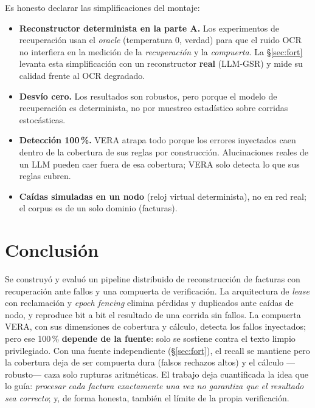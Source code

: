Es honesto declarar las simplificaciones del montaje:
\begin{itemize}[leftmargin=1.4em,itemsep=1pt]
  \item \textbf{Reconstructor determinista en la parte A.} Los experimentos de recuperación
    usan el \emph{oracle} (temperatura 0, verdad) para que el ruido OCR no interfiera en la
    medición de la \emph{recuperación} y la \emph{compuerta}. La §\ref{sec:fort} levanta esta
    simplificación con un reconstructor \textbf{real} (LLM-GSR) y mide su calidad frente al OCR
    degradado.
  \item \textbf{Desvío cero.} Los resultados son robustos, pero porque el modelo de
    recuperación es determinista, no por muestreo estadístico sobre corridas estocásticas.
  \item \textbf{Detección 100\,\%.} VERA atrapa todo porque los errores inyectados caen dentro
    de la cobertura de sus reglas por construcción. Alucinaciones reales de un LLM pueden caer
    fuera de esa cobertura; VERA solo detecta lo que sus reglas cubren.
  \item \textbf{Caídas simuladas en un nodo} (reloj virtual determinista), no en red real; el
    corpus es de un solo dominio (facturas).
\end{itemize}

\section{Conclusión}

Se construyó y evaluó un pipeline distribuido de reconstrucción de facturas con recuperación
ante fallos y una compuerta de verificación. La arquitectura de \emph{lease} con reclamación
y \emph{epoch fencing} elimina pérdidas y duplicados ante caídas de nodo, y reproduce bit a
bit el resultado de una corrida sin fallos. La compuerta VERA, con sus dimensiones de
cobertura y cálculo, detecta los fallos inyectados; pero ese 100\,\% \textbf{depende de la
fuente}: solo se sostiene contra el texto limpio privilegiado. Con una fuente independiente
(§\ref{sec:fort}), el recall se mantiene pero la cobertura deja de ser compuerta dura (falsos
rechazos altos) y el cálculo ---robusto--- caza solo rupturas aritméticas. El trabajo deja
cuantificada la idea que lo guía: \emph{procesar cada factura exactamente una vez no garantiza
que el resultado sea correcto}; y, de forma honesta, también el límite de la propia
verificación.

